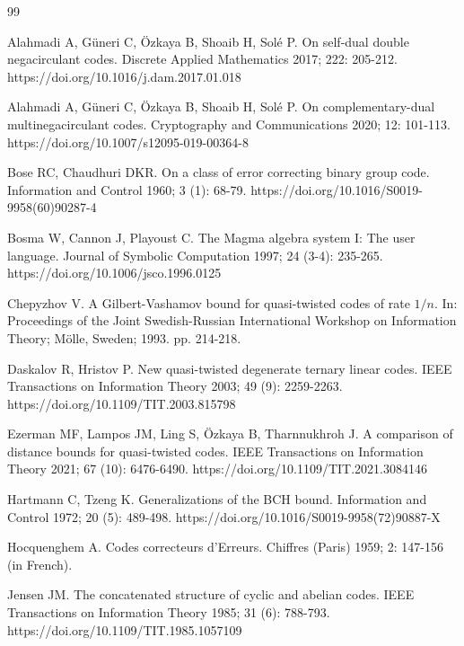 \documentclass[11pt]{amsart}
\theoremstyle{plain}
\theoremstyle{definition}
\numberwithin{equation}{section}
\begin{document}
\begin{thebibliography}{99}

 Alahmadi A, G\"uneri C, \"Ozkaya B, Shoaib H, Sol\'{e} P. On self-dual double negacirculant codes. Discrete Applied Mathematics 2017; 222: 205-212. https://doi.org/10.1016/j.dam.2017.01.018

 Alahmadi A, G\"uneri C, \"Ozkaya B, Shoaib H, Sol\'{e} P. On complementary-dual multinegacirculant codes. Cryptography and Communications 2020; 12: 101-113. https://doi.org/10.1007/s12095-019-00364-8

 Bose RC,  Chaudhuri DKR. On a class of error correcting binary group code. Information and Control 1960; 3 (1): 68-79. https://doi.org/10.1016/S0019-9958(60)90287-4

 Bosma W, Cannon J, Playoust C. The Magma algebra system I: The user language. Journal of Symbolic Computation 1997; 24 (3-4): 235-265. https://doi.org/10.1006/jsco.1996.0125

 Chepyzhov V. A Gilbert-Vashamov bound for quasi-twisted codes of rate $1/n$. In: Proceedings of the Joint Swedish-Russian International Workshop on Information Theory; M\"olle, Sweden; 1993. pp. 214-218.

 Daskalov R, Hristov P. New quasi-twisted degenerate ternary linear codes. IEEE Transactions on Information Theory 2003; 49 (9): 2259-2263. https://doi.org/10.1109/TIT.2003.815798

 Ezerman MF, Lampos JM, Ling S, \"Ozkaya B, Tharnnukhroh J. A comparison of distance bounds for quasi-twisted codes. IEEE Transactions on Information Theory 2021; 67 (10): 6476-6490. https://doi.org/10.1109/TIT.2021.3084146


 Hartmann C, Tzeng K. Generalizations of the BCH bound. Information and Control 1972; 20 (5): 489-498. https://doi.org/10.1016/S0019-9958(72)90887-X

 Hocquenghem A. Codes correcteurs d'Erreurs. Chiffres (Paris) 1959; 2: 147-156 (in French).

  Jensen JM. The concatenated structure of cyclic and abelian codes. IEEE Transactions on Information Theory 1985; 31 (6):  788-793. https://doi.org/10.1109/TIT.1985.1057109


\end{thebibliography}
\end{document}
